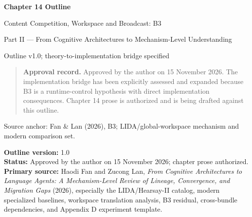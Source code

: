 


\thispagestyle{empty}
\begin{center}
\vspace*{2.2cm}
{\Huge\bfseries Chapter 14 Outline}\par
\vspace{0.7cm}
{\LARGE Content Competition, Workspace and Broadcast: B3}\par
\vspace{0.8cm}
{\Large Part II --- From Cognitive Architectures to Mechanism-Level Understanding}\par
\vspace{1.2cm}
{\large Outline v1.0; theory-to-implementation bridge specified}\par
\vfill
\begin{minipage}{0.82\linewidth}
\begin{quote}
\textbf{Approval record.} Approved by the author on 15 November 2026. The implementation bridge has been explicitly assessed and expanded because B3 is a runtime-control hypothesis with direct implementation consequences. Chapter 14 prose is authorized and is being drafted against this outline.
\end{quote}
\end{minipage}
\vfill
{\large Source anchor: Fan \& Lan (2026), B3; LIDA/global-workspace mechanism and modern comparison set.}\par
{}
\vspace{0.5cm}
\autocite{franklin2012lida,shang2026theaterofmind,liu2024dylan,li2025adaptivegraphpruning}
\vspace{1cm}
\end{center}
\clearpage
\tableofcontents
\clearpage
{}
\setcounter{chapter}{13}
\setcounter{secnumdepth}{0}
\textbf{Outline version:} 1.0\\
\textbf{Status:} Approved by the author on 15 November 2026; chapter prose authorized.\\
\textbf{Primary source:} Haodi Fan and Zucong Lan, \emph{From Cognitive Architectures to Language Agents: A Mechanism-Level Review of Lineage, Convergence, and Migration Gaps} (2026), especially the LIDA/Hearsay-II catalog, modern specialized baselines, workspace translation analysis, B3 residual, cross-bundle dependencies, and Appendix D experiment template.\\
